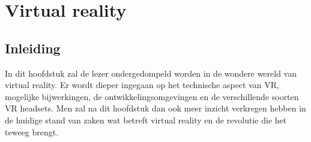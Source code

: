 \chapter{Virtual reality}
\label{ch:stand-van-zaken}




%


\section{Inleiding}
In dit hoofdstuk zal de lezer ondergedompeld worden in de wondere wereld van virtual reality. Er wordt dieper ingegaan op het technische aspect van VR, mogelijke bijwerkingen, de ontwikkelingsomgevingen en de verschillende soorten VR headsets. Men zal na dit hoofdstuk dan ook meer inzicht verkregen hebben in de huidige stand van zaken wat betreft virtual reality en de revolutie die het teweeg brengt.

